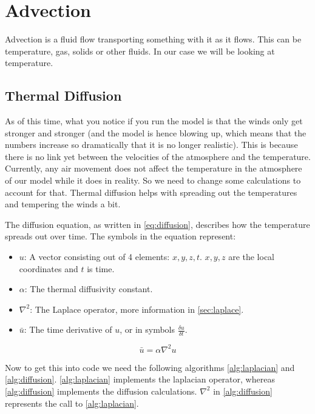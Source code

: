 \section{Advection} \label{sec:adv}
Advection is a fluid flow transporting something with it as it flows. This can be temperature, gas, solids or other fluids. In our case we will be looking at temperature.

\subsection{Thermal Diffusion}
As of this time, what you notice if you run the model is that the winds only get stronger and stronger (and the model is hence blowing up, which means that the numbers increase so dramatically 
that it is no longer realistic). This is because there is no link yet between the velocities of the atmosphere and the temperature. Currently, any air movement does not affect the temperature 
in the atmosphere of our model while it does in reality. So we need to change some calculations to account for that. Thermal diffusion helps with spreading out the temperatures and tempering 
the winds a bit.

The diffusion equation, as written in \autoref{eq:diffusion}, describes how the temperature spreads out over time\cite{diffusion}. The symbols in the equation represent:

\begin{itemize}
    \item $u$: A vector consisting out of 4 elements: $x, y, z, t$. $x, y, z$ are the local coordinates and $t$ is time.
    \item $\alpha$: The thermal diffusivity constant.
    \item $\nabla^2$: The Laplace operator, more information in \autoref{sec:laplace}.
    \item $\bar{u}$: The time derivative of $u$, or in symbols $\frac{\delta u}{\delta t}$.
\end{itemize}

\begin{equation}
    \bar{u} = \alpha \nabla^2 u
    \label{eq:diffusion}
\end{equation}

Now to get this into code we need the following algorithms \autoref{alg:laplacian} and \autoref{alg:diffusion}. \autoref{alg:laplacian} implements the laplacian operator, whereas 
\autoref{alg:diffusion} implements the diffusion calculations.  $\nabla^2$ in \autoref{alg:diffusion} represents the call to \autoref{alg:laplacian}.

